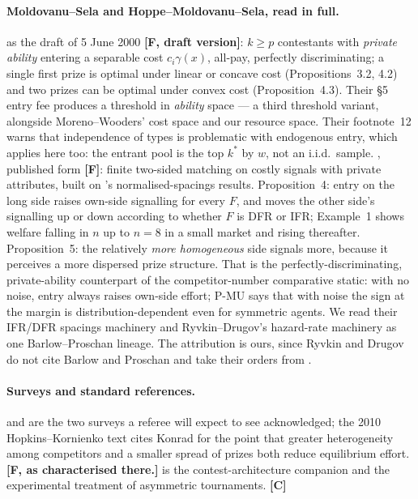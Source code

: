 \documentclass[11pt,a4paper]{article}
\begin{document}
\paragraph{Moldovanu--Sela and Hoppe--Moldovanu--Sela, read in full.}
\citet{MoldovanuSela2001} as the draft of 5 June 2000 \textbf{[F, draft
version]}: $k \geq p$ contestants with \emph{private ability} entering a
separable cost $c_i \gamma(x)$, all-pay, perfectly discriminating; a single
first prize is optimal under linear or concave cost (Propositions~3.2, 4.2)
and two prizes can be optimal under convex cost (Proposition~4.3). Their \S 5
entry fee produces a threshold in \emph{ability} space --- a third threshold
variant, alongside Moreno--Wooders' cost space and our resource space. Their
footnote~12 warns that independence of types is problematic with endogenous
entry, which applies here too: the entrant pool is the top $k^*$ by $w$, not an
i.i.d.\ sample. \citet{HoppeMoldovanuSela2009}, published form \textbf{[F]}:
finite two-sided matching on costly signals with private attributes, built on
\citet{BarlowProschan1966}'s normalised-spacings results. Proposition~4: entry
on the long side raises own-side signalling for every $F$, and moves the
other side's signalling up or down according to whether $F$ is DFR or IFR;
Example~1 shows welfare falling in $n$ up to $n = 8$ in a small market and
rising thereafter. Proposition~5: the relatively \emph{more homogeneous} side
signals more, because it perceives a more dispersed prize structure. That is
the perfectly-discriminating, private-ability counterpart of the
competitor-number comparative static: with no noise, entry always raises
own-side effort; P-MU says that with noise the sign at the margin is
distribution-dependent even for symmetric agents. We read their IFR/DFR
spacings machinery and Ryvkin--Drugov's hazard-rate machinery as one
Barlow--Proschan lineage. The attribution is ours, since Ryvkin and Drugov do
not cite Barlow and Proschan and take their orders from
\citet{ShakedShanthikumar2007}.

\paragraph{Surveys and standard references.} \citet{Konrad2009} and
\citet{Corchon2007} are the two surveys a referee will expect to see
acknowledged; the 2010 Hopkins--Kornienko text cites Konrad for the point that
greater heterogeneity among competitors and a smaller spread of prizes both
reduce equilibrium effort. \textbf{[F, as characterised there.]}
\citet{MoldovanuSela2006} is the contest-architecture companion and
\citet{SchotterWeigelt1992} the experimental treatment of asymmetric
tournaments. \textbf{[C]}
\end{document}

